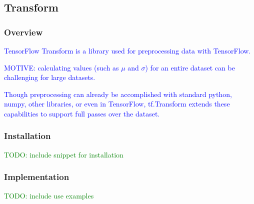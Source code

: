 \subsection{Transform}

\subsubsection{Overview}

\textcolor{blue}{TensorFlow Transform is a library used for preprocessing data with TensorFlow.}

\textcolor{blue}{MOTIVE: calculating values (such as $\mu$ and $\sigma$) for an entire dataset can be challenging for large datasets.}

\textcolor{blue}{Though preprocessing can already be accomplished with standard python, numpy, other libraries, or even in TensorFlow, tf.Transform extends these capabilities to support full passes over the dataset.}

\subsubsection{Installation}

\textcolor{green}{TODO: include snippet for installation}

\subsubsection{Implementation}

\textcolor{green}{TODO: include use examples}


